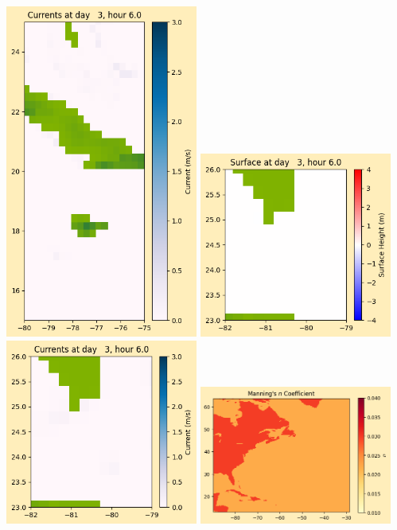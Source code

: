 \documentclass[11pt]{article}
\begin{document}
\includegraphics[width=0.475\textwidth]{frame0025fig1008.png}
\vskip 10pt 
\includegraphics[width=0.475\textwidth]{frame0025fig1009.png}
\includegraphics[width=0.475\textwidth]{frame0025fig1010.png}
\vskip 10pt 
\includegraphics[width=0.475\textwidth]{frame0025fig1011.png}
\end{document}
